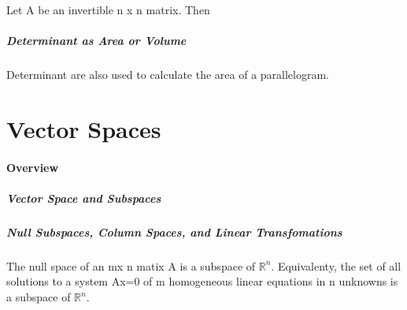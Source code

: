 \documentclass{article}
\begin{document}
\begin{theorem}
\end{theorem}

\begin{theorem}
    Let A be an invertible n x n matrix. Then
\end{theorem}

\subsubsection{Determinant as Area or Volume}

Determinant are also used to calculate the area of a parallelogram.


\part{Vector Spaces}
\subsection{Overview}

\subsubsection{Vector Space and Subspaces}

\begin{definition}
\end{definition}

\begin{definition}[Subspace]
\end{definition}

\subsubsection{Null Subspaces, Column Spaces, and Linear Transfomations}

\begin{definition}
\end{definition}

\begin{theorem}
    The null space of an mx n matix A is a subspace of $\mathbb{R}^n$. Equivalenty,
    the set of all solutions to a system Ax=0 of m homogeneous linear equations
    in n unknowns is a subspace of $\mathbb{R}^n$.
\end{theorem}

\begin{definition}
\end{definition}
\end{document}

